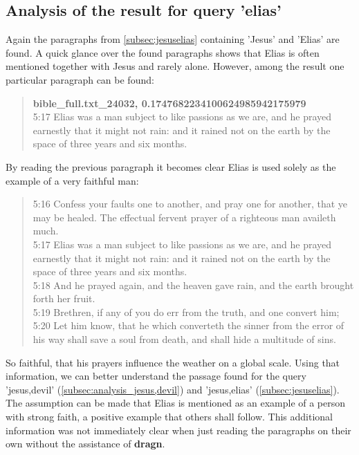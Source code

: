 \subsection{Analysis of the result for query 'elias'}
Again the paragraphs from \ref{subsec:jesuselias} containing 'Jesus' and 'Elias' are found. A quick glance over the found paragraphs shows that Elias is often mentioned together with Jesus and rarely alone. However, among the result one particular paragraph can be found:
\blockquote{
\textbf{bible\_full.txt\_24032, 0.1747682234100624985942175979}\\
5:17 Elias was a man subject to like passions as we are, and he prayed earnestly that it might not rain: and it rained not on the earth by the space of three years and six months.}
By reading the previous paragraph it becomes clear Elias is used solely as the example of a very faithful man:

\blockquote{
5:16 Confess your faults one to another, and pray one for another, that ye may be healed. The effectual fervent prayer of a righteous man availeth much.\\
5:17 Elias was a man subject to like passions as we are, and he prayed earnestly that it might not rain: and it rained not on the earth by the space of three years and six months.\\
5:18 And he prayed again, and the heaven gave rain, and the earth brought forth her fruit.\\
5:19 Brethren, if any of you do err from the truth, and one convert him; 5:20 Let him know, that he which converteth the sinner from the error of his way shall save a soul from death, and shall hide a multitude of sins.
}
So faithful, that his prayers influence the weather on a global scale. Using that information, we can better understand the passage found for the query 'jesus,devil' (\ref{subsec:analysis_jesus,devil}) and 'jesus,elias' (\ref{subsec:jesuselias}). The assumption can be made that Elias is mentioned as an example of a person with strong faith, a positive example that others shall follow. This additional information was not immediately clear when just reading the paragraphs on their own without the assistance of \textbf{dragn}.

